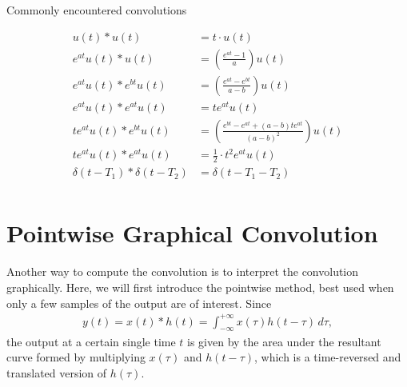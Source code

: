 \documentclass{report}
\begin{document}
\begin{table}[hbt!]
    \centering
    \caption{Commonly encountered convolutions}
    \label{common_conv}
    \begin{mdframed}
    \begin{align}
        u(t)*u(t) &= t\cdot u(t) \\[0.25cm]
        e^{at}u(t)*u(t) &= \left(\frac{e^{at}-1}{a}\right) u(t) \\[0.25cm]
        e^{at}u(t)*e^{bt}u(t) &= \left(\frac{e^{at}-e^{bt}}{a-b}\right) u(t) \\[0.25cm]
        e^{at}u(t)*e^{at}u(t) &= te^{at} u(t) \\[0.25cm]
        te^{at}u(t)*e^{bt}u(t) &= \left(\frac{e^{bt}-e^{at}+(a-b)te^{at}}{(a-b)^2}\right) u(t) \\[0.25cm]
        te^{at}u(t)*e^{at}u(t) &= \frac{1}{2} \cdot t^2 e^{at} u(t) \\[0.25cm]
        \delta(t-T_1)*\delta(t-T_2) &= \delta(t-T_1-T_2) \\[0.15cm] \nonumber
    \end{align}
    \end{mdframed}
\end{table} 

\section{Pointwise Graphical Convolution}
Another way to compute the convolution is to interpret the convolution graphically. Here, we will first introduce the pointwise method, 
best used when only a few samples of the output are of interest. Since 
\begin{align*}
    y(t) = x(t) * h(t) = \int_{-\infty}^{+\infty} x(\tau)h(t-\tau) \,d\tau,
\end{align*}
the output at a certain single time $t$ is given by the area under the resultant curve formed by multiplying $x(\tau)$ and $h(t-\tau)$, which is a time-reversed and translated 
version of $h(\tau)$. 
\end{document}
